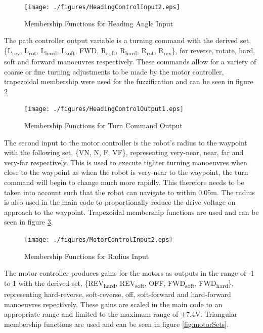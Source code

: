 \documentclass[11pt]{article}
\begin{document}
\begin{figure}[H]
    \centering
\texttt{[image: ./figures/HeadingControlInput2.eps]}
\caption{Membership Functions for Heading Angle Input}
\label{fig:headingSets}
\end{figure}

The path controller output variable is a turning command with the derived set, 
\{L\textsubscript{rev}, L\textsubscript{rot}, L\textsubscript{hard}, L\textsubscript{soft}, FWD, R\textsubscript{soft}, R\textsubscript{hard}, R\textsubscript{rot}, R\textsubscript{rev}\},
for reverse, rotate, hard, soft and forward manoeuvres respectively. 
These commands allow for a variety of coarse or fine turning adjustments to be made by the motor controller, trapezoidal membership were used for the fuzzification and can be seen in figure \ref{fig:commandSets}
\begin{figure}[H]
    \centering
\texttt{[image: ./figures/HeadingControlOutput1.eps]}
\caption{Membership Functions for Turn Command Output}
\label{fig:commandSets}
\end{figure}

The second input to the motor controller is the robot's radius to the waypoint with the following set, \{VN, N, F, VF\}, representing very-near, near, far and very-far respectively.
This is used to execute tighter turning manoeuvres when close to the waypoint as when the robot is very-near to the waypoint, the turn command will begin to change much more rapidly.
This therefore needs to be taken into account such that the robot can navigate to within 0.05m.
The radius is also used in the main code to proportionally reduce the drive voltage on approach to the waypoint.
Trapezoidal membership functions are used and can be seen in figure \ref{fig:radiusSets}.

\begin{figure}[H]
    \centering
\texttt{[image: ./figures/MotorControlInput2.eps]}
\caption{Membership Functions for Radius Input}
\label{fig:radiusSets}
\end{figure}

The motor controller produces gains for the motors as outputs in the range of -1 to 1 with the derived set, \{REV\textsubscript{hard}, REV\textsubscript{soft}, OFF, FWD\textsubscript{soft}, FWD\textsubscript{hard}\},
representing hard-reverse, soft-reverse, off, soft-forward and hard-forward manoeuvres repectively. 
These gains are scaled in the main code to an appropriate range and limited to the maximum range of $\pm$7.4V. 
Triangular membership functions are used and can be seen in figure \ref{fig:motorSets}.
\end{document}
